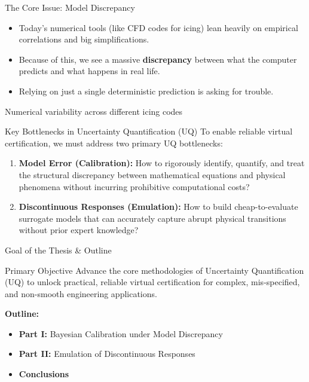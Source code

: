 \begin{frame}{The Core Issue: Model Discrepancy}
    \begin{itemize}
        \item Today's numerical tools (like CFD codes for icing) lean heavily on empirical correlations and big simplifications.
        \item Because of this, we see a massive \textbf{discrepancy} between what the computer predicts and what happens in real life.
        \item Relying on just a single deterministic prediction is asking for trouble.
    \end{itemize}
    \vspace{0.5cm}
    \centering
    \small{Numerical variability across different icing codes~\cite{many_ice_shapes_summary}}
\end{frame}

\begin{frame}{Key Bottlenecks in Uncertainty Quantification (UQ)}
    To enable reliable virtual certification, we must address two primary UQ bottlenecks:
    \vspace{0.5cm}
    \begin{enumerate}
        \item \textbf{Model Error (Calibration):} How to rigorously identify, quantify, and treat the structural discrepancy between mathematical equations and physical phenomena without incurring prohibitive computational costs?
        \vspace{0.3cm}
        \item \textbf{Discontinuous Responses (Emulation):} How to build cheap-to-evaluate surrogate models that can accurately capture abrupt physical transitions without prior expert knowledge?
    \end{enumerate}
\end{frame}

\begin{frame}{Goal of the Thesis \& Outline}
    \begin{block}{Primary Objective}
        Advance the core methodologies of Uncertainty Quantification (UQ) to unlock practical, reliable virtual certification for complex, mis-specified, and non-smooth engineering applications.
    \end{block}
    \vspace{0.5cm}
    \textbf{Outline:}
    \begin{itemize}
        \item \textbf{Part I:} Bayesian Calibration under Model Discrepancy
        \item \textbf{Part II:} Emulation of Discontinuous Responses
        \item \textbf{Conclusions}
    \end{itemize}
\end{frame}

